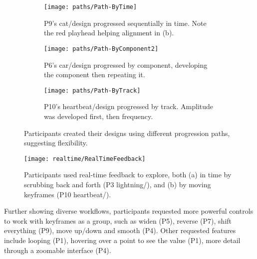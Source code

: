 \begin{figure}[Htb]
\centering
\begin{subfigure}{4.5in}
    \centering
    \texttt{[image: paths/Path-ByTime]}
    \caption{P9's cat/\none design progressed sequentially in time.
    Note the red playhead helping alignment in (b).
     }
    \label{fig:path:bytime}
\end{subfigure}

\begin{subfigure}{4.5in}
    \centering
    \texttt{[image: paths/Path-ByComponent2]}
    \caption{P6's car/\lo design progressed by component, developing the component then repeating it.}
    \label{fig:path:bycomponent}
\end{subfigure}

\begin{subfigure}{4.5in}
    \centering
    \texttt{[image: paths/Path-ByTrack]}
    \caption{P10's heartbeat/\vis design progressed by track. Amplitude was developed first, then frequency.
    }
    \label{fig:path:bytrack}
\end{subfigure}
\caption{Participants created their designs using different progression paths, suggesting flexibility.}
\label{fig:path}
\end{figure}
%
   \begin{figure}[Htb]
    \centering
    \texttt{[image: realtime/RealTimeFeedback]}
    \caption{Participants used real-time feedback to explore, both (a) in time by scrubbing back and forth (P3 lightning/\lo), and (b) by moving keyframes (P10 heartbeat/\vis).
        }
    \label{fig:realtimefeedback}
\end{figure}
    

    Further showing diverse workflows, participants requested more powerful controls to work with keyframes as a group, such as widen (P5), reverse (P7), shift everything (P9), move up/down and smooth (P4). %
    Other requested features include looping (P1), hovering over a point to see the value (P1), more detail through a zoomable interface (P4). 


